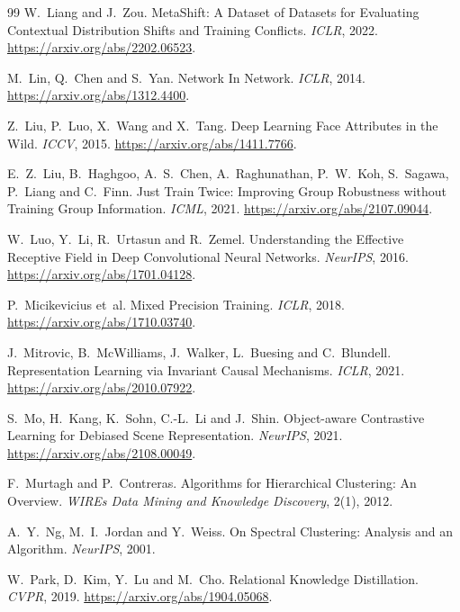 \documentclass[11pt]{article}
\begin{document}
\begin{thebibliography}{99}
W.~Liang and J.~Zou. MetaShift: A Dataset of Datasets for Evaluating Contextual Distribution Shifts and Training
Conflicts. \emph{ICLR}, 2022. \url{https://arxiv.org/abs/2202.06523}.

M.~Lin, Q.~Chen and S.~Yan. Network In Network. \emph{ICLR}, 2014. \url{https://arxiv.org/abs/1312.4400}.

Z.~Liu, P.~Luo, X.~Wang and X.~Tang. Deep Learning Face Attributes in the Wild. \emph{ICCV}, 2015.
\url{https://arxiv.org/abs/1411.7766}.

E.~Z.~Liu, B.~Haghgoo, A.~S.~Chen, A.~Raghunathan, P.~W.~Koh, S.~Sagawa, P.~Liang and C.~Finn. Just Train Twice:
Improving Group Robustness without Training Group Information. \emph{ICML}, 2021.
\url{https://arxiv.org/abs/2107.09044}.

W.~Luo, Y.~Li, R.~Urtasun and R.~Zemel. Understanding the Effective Receptive Field in Deep Convolutional Neural
Networks. \emph{NeurIPS}, 2016. \url{https://arxiv.org/abs/1701.04128}.

P.~Micikevicius et~al. Mixed Precision Training. \emph{ICLR}, 2018. \url{https://arxiv.org/abs/1710.03740}.

J.~Mitrovic, B.~McWilliams, J.~Walker, L.~Buesing and C.~Blundell. Representation Learning via Invariant Causal
Mechanisms. \emph{ICLR}, 2021. \url{https://arxiv.org/abs/2010.07922}.

S.~Mo, H.~Kang, K.~Sohn, C.-L.~Li and J.~Shin. Object-aware Contrastive Learning for Debiased Scene Representation.
\emph{NeurIPS}, 2021. \url{https://arxiv.org/abs/2108.00049}.

F.~Murtagh and P.~Contreras. Algorithms for Hierarchical Clustering: An Overview. \emph{WIREs Data Mining and Knowledge
Discovery}, 2(1), 2012.

A.~Y.~Ng, M.~I.~Jordan and Y.~Weiss. On Spectral Clustering: Analysis and an Algorithm. \emph{NeurIPS}, 2001.

W.~Park, D.~Kim, Y.~Lu and M.~Cho. Relational Knowledge Distillation. \emph{CVPR}, 2019.
\url{https://arxiv.org/abs/1904.05068}.


\end{thebibliography}
\end{document}
